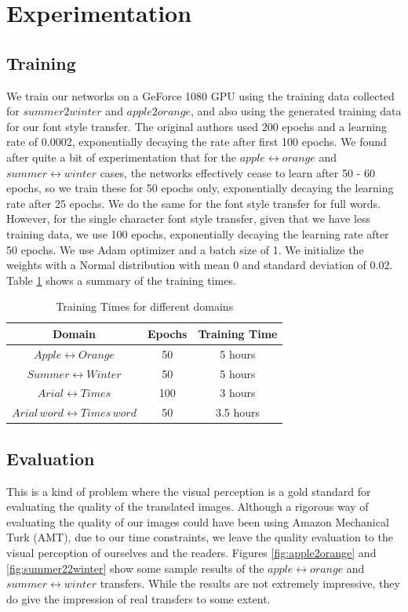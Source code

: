 \documentclass[10pt,twocolumn,letterpaper]{article}
\begin{document}
\section{Experimentation}

\subsection{Training}
We train our networks on a GeForce 1080 GPU using the training data collected for $summer2winter$ and $apple2orange$, and also using the generated training data for our
font style transfer. The original authors \cite{cyclegan} used 200 epochs and a learning rate of 0.0002, exponentially decaying the rate after first 100 epochs. We found after 
quite a bit of experimentation that for the $apple \leftrightarrow orange$ and $summer \leftrightarrow winter$ cases, the networks effectively cease to learn after 50 - 60 epochs, so we train these for 50 epochs only, exponentially decaying the learning rate after 25 epochs. We do the same for the font style transfer for full words. However, for the single character font style transfer, given that we have less training data, we use 100 epochs, exponentially decaying the learning rate after 50 epochs. We use Adam optimizer and a batch size of 1. We initialize the weights with a Normal distribution with mean 0 and standard deviation of 0.02. Table \ref{table:train} shows a summary of the training times.

\begin{table}[ht!]  
\begin{center}
\begin{tabular}{ |c|c|c| } 
 \hline
 \textbf{Domain} & \textbf{Epochs} & \textbf{Training Time} \\ 
 \hline
 $Apple \leftrightarrow Orange$ & 50 & 5 hours \\ 
 \hline
 $Summer \leftrightarrow Winter$ & 50 & 5 hours \\ 
 \hline
 $Arial \leftrightarrow Times$ & 100 & 3 hours \\ 
 \hline
 $Arial \, word\leftrightarrow Times \, word$ & 50 & 3.5 hours \\ 
 \hline
\end{tabular}
\end{center}
\caption{Training Times for different domains}
\label{table:train}
\end{table}

\subsection{Evaluation}
This is a kind of problem where the visual perception is a gold standard for
evaluating the quality of the translated images. Although a rigorous way of evaluating the quality of our images could have been using 
Amazon Mechanical Turk (AMT), due to our time constraints, we leave the quality
evaluation to the visual perception of ourselves and the readers. Figures 
\ref{fig:apple2orange} and \ref{fig:summer22winter} show some sample results of 
the $apple \leftrightarrow orange$ and $summer \leftrightarrow winter$ transfers. While 
the results are not extremely impressive, they do give the impression of real transfers to some extent.
\end{document}
